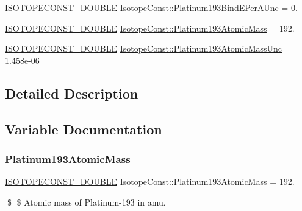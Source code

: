 \begin{DoxyCompactItemize}
\mbox{\hyperlink{group___isotope_const-_macros_ga8f45a7272ce02c0b4c65c44636ed719a}{I\+S\+O\+T\+O\+P\+E\+C\+O\+N\+S\+T\+\_\+\+D\+O\+U\+B\+LE}} \mbox{\hyperlink{group___isotope_const-_platinum-_pt193_ga014df1422f7568870de4b7968473d8c4}{Isotope\+Const\+::\+Platinum193\+Bind\+E\+Per\+A\+Unc}} = 0.
\item 
\mbox{\hyperlink{group___isotope_const-_macros_ga8f45a7272ce02c0b4c65c44636ed719a}{I\+S\+O\+T\+O\+P\+E\+C\+O\+N\+S\+T\+\_\+\+D\+O\+U\+B\+LE}} \mbox{\hyperlink{group___isotope_const-_platinum-_pt193_gafd42adfff37de69ae6c381e34af3532c}{Isotope\+Const\+::\+Platinum193\+Atomic\+Mass}} = 192.
\item 
\mbox{\hyperlink{group___isotope_const-_macros_ga8f45a7272ce02c0b4c65c44636ed719a}{I\+S\+O\+T\+O\+P\+E\+C\+O\+N\+S\+T\+\_\+\+D\+O\+U\+B\+LE}} \mbox{\hyperlink{group___isotope_const-_platinum-_pt193_gacfce3bfed4732fd6ddfc5f3850caaf05}{Isotope\+Const\+::\+Platinum193\+Atomic\+Mass\+Unc}} = 1.\+458e-\/06
\end{DoxyCompactItemize}


\subsection{Detailed Description}


\subsection{Variable Documentation}
\mbox{\label{group___isotope_const-_platinum-_pt193_gafd42adfff37de69ae6c381e34af3532c}} 
\subsubsection{\texorpdfstring{Platinum193\+Atomic\+Mass}{Platinum193AtomicMass}}
{\footnotesize\ttfamily \mbox{\hyperlink{group___isotope_const-_macros_ga8f45a7272ce02c0b4c65c44636ed719a}{I\+S\+O\+T\+O\+P\+E\+C\+O\+N\+S\+T\+\_\+\+D\+O\+U\+B\+LE}} Isotope\+Const\+::\+Platinum193\+Atomic\+Mass = 192.}

\$ \$ Atomic mass of Platinum-\/193 in amu. \mbox{\label{group___isotope_const-_platinum-_pt193_gacfce3bfed4732fd6ddfc5f3850caaf05}} 
